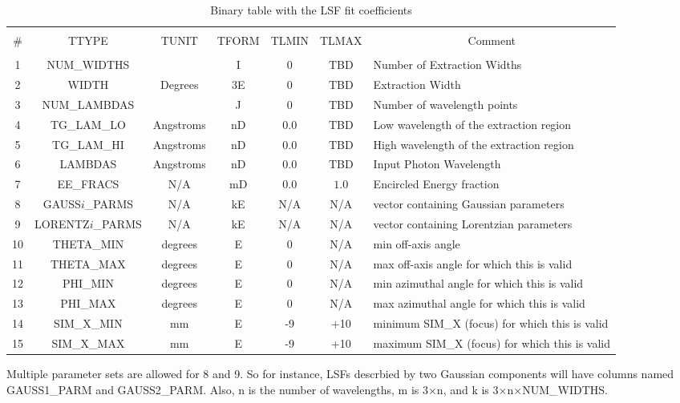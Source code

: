 \documentclass[twoside]{article}
\begin{document}
\begin{table}[h]
\begin{center}
{\small
\begin{tabular}{|c|c|c|c|c|c|p{1.8in}|}
\hline
 & & & & & & \\
 \#
 & TTYPE
 & TUNIT
 & TFORM
 & TLMIN
 & TLMAX
 & \multicolumn{1}{|c|}{Comment}\\
 & & & & & & \\\hline
%
 1
 & NUM\_WIDTHS
 &
 & I
 & 0
 & \sc TBD
 & Number of Extraction Widths \\\hline
%
 2
 & WIDTH
 & Degrees
 & 3E
 & 0
 & \sc TBD
 & Extraction Width \\\hline
%
 3
 & NUM\_LAMBDAS
 &
 & J
 & 0
 & \sc TBD
 & Number of wavelength points \\\hline
%
 4
 & TG\_LAM\_LO
 & Angstroms
 & nD
 & $0.0$
 & \sc TBD
 & Low wavelength of the extraction region\\\hline
%
 5
 & TG\_LAM\_HI
 & Angstroms
 & nD
 & $0.0$
 & \sc TBD
 & High wavelength of the extraction region\\\hline
%
 6
 & LAMBDAS
 & Angstroms
 & nD
 & $0.0$
 & \sc TBD
 & Input Photon Wavelength \\\hline
%
 7
 & EE\_FRACS
 & N/A
 & mD
 & $0.0$
 & $1.0$
 & Encircled Energy fraction\\\hline
%
 8
 & GAUSS$i$\_PARMS
 & N/A
 & kE
 & N/A
 & N/A
 & vector containing Gaussian parameters\\\hline
%
 9
 & LORENTZ$i$\_PARMS
 & N/A
 & kE
 & N/A
 & N/A
 & vector containing Lorentzian parameters\\\hline
%
 10
 & THETA\_MIN
 & degrees
 & E
 & 0
 & N/A
 & min off-axis angle\\\hline
%
 11
 & THETA\_MAX
 & degrees
 & E
 & 0
 & N/A
 & max off-axis angle for which this is valid\\\hline
%
 12
 & PHI\_MIN
 & degrees
 & E
 & 0
 & N/A
 & min azimuthal angle for which this is valid\\\hline
%
 13
 & PHI\_MAX
 & degrees
 & E
 & 0
 & N/A
 & max azimuthal angle for which this is valid\\\hline
 14
 & SIM\_X\_MIN
 & mm
 & E
 & -9
 & +10
 & minimum SIM\_X (focus) for which this is valid\\\hline
 15
 & SIM\_X\_MAX
 & mm
 & E
 & -9
 & +10
 & maximum SIM\_X (focus) for which this is valid\\\hline
%
\end{tabular}
}%
\caption{Binary table with the LSF fit coefficients}
\label{tab:parms}
\end{center}
\end{table}%
Multiple parameter
sets are allowed for 8 and 9. So for instance, LSFs descrbied by two Gaussian components will have columns named GAUSS1\_PARM and GAUSS2\_PARM.
Also, n is the number of wavelengths, m is 3$\times$n, and k is
3$\times$n$\times$NUM\_WIDTHS.
%
\end{document}
